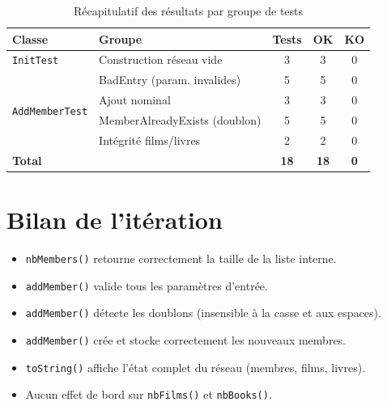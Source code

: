 \documentclass[12pt,a4paper]{article}
\newcommand{\cmark}{\textcolor{darkgreen}{\ding{51}}}
\begin{document}
\begin{table}[H]
  \centering
  \caption{Récapitulatif des résultats par groupe de tests}
  \begin{tabularx}{\linewidth}{l X c c c}
    \toprule
    \textbf{Classe} & \textbf{Groupe} & \textbf{Tests} & \textbf{OK} & \textbf{KO} \\
    \midrule
    \texttt{InitTest}     & Construction réseau vide & 3  & 3  & 0 \\
    \multirow{4}{*}{\texttt{AddMemberTest}}
                          & BadEntry (param. invalides)  & 5  & 5  & 0 \\
                          & Ajout nominal                & 3  & 3  & 0 \\
                          & MemberAlreadyExists (doublon)& 5  & 5  & 0 \\
                          & Intégrité films/livres       & 2  & 2  & 0 \\
    \midrule
    \textbf{Total}        &                              & \textbf{18} & \textbf{18} & \textbf{0} \\
    \bottomrule
  \end{tabularx}
\end{table}

\section{Bilan de l'itération}

\begin{successbox}
  \begin{itemize}[noitemsep]
    \item[\cmark] \texttt{nbMembers()} retourne correctement la taille de la liste interne.
    \item[\cmark] \texttt{addMember()} valide tous les paramètres d'entrée.
    \item[\cmark] \texttt{addMember()} détecte les doublons (insensible à la casse et aux espaces).
    \item[\cmark] \texttt{addMember()} crée et stocke correctement les nouveaux membres.
    \item[\cmark] \texttt{toString()} affiche l'état complet du réseau (membres, films, livres).
    \item[\cmark] Aucun effet de bord sur \texttt{nbFilms()} et \texttt{nbBooks()}.
  \end{itemize}
\end{successbox}
\end{document}
